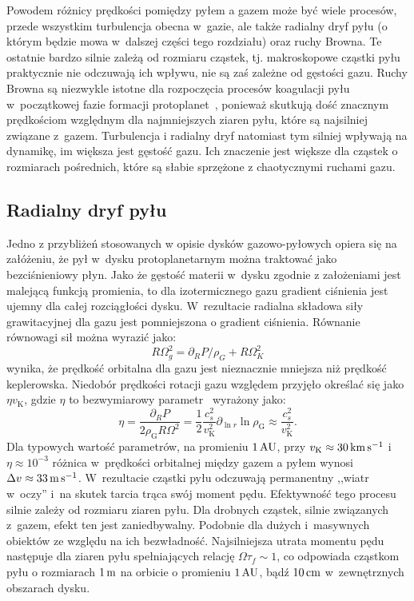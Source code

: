 %
Powodem różnicy prędkości pomiędzy pyłem a gazem może być wiele
procesów, przede wszystkim turbulencja obecna w~gazie, ale także radialny dryf
pyłu (o którym będzie mowa w~dalszej części tego rozdziału) oraz ruchy
Browna. Te ostatnie bardzo silnie zależą od rozmiaru cząstek, tj.
makroskopowe cząstki pyłu praktycznie nie odczuwają ich wpływu, nie są zaś
zależne od gęstości gazu. Ruchy Browna są niezwykle istotne dla rozpoczęcia
procesów koagulacji pyłu w~początkowej fazie formacji
protoplanet~\citep{DD05}, ponieważ skutkują dość znacznym prędkościom względnym
dla najmniejszych ziaren pyłu, które są najsilniej związane z~gazem. Turbulencja
i radialny dryf natomiast tym silniej wpływają na dynamikę, im większa jest
gęstość gazu. Ich znaczenie jest większe dla cząstek o rozmiarach pośrednich, które
są słabie sprzężone z chaotycznymi ruchami gazu.

\subsection{Radialny dryf pyłu}
Jedno z przybliżeń stosowanych w opisie dysków gazowo-pyłowych opiera się na
załóżeniu, że pył w~dysku protoplanetarnym można traktować jako bezciśnieniowy płyn. 
Jako że gęstość materii w~dysku zgodnie z założeniami jest malejącą funkcją
promienia, to dla izotermicznego gazu gradient ciśnienia jest ujemny dla całej
rozciągłości dysku. W~rezultacie radialna składowa siły grawitacyjnej dla gazu
jest pomniejszona o gradient ciśnienia. Równanie równowagi sił można wyrazić
jako:
%
\begin{equation}
   R\Omega_g^2 = \partial_R P / \rho_G + R\Omega_K^2
\end{equation}
%
wynika, że prędkość orbitalna dla gazu jest nieznacznie mniejsza niż prędkość
keplerowska. Niedobór prędkości rotacji gazu względem przyjęło określać się jako
$\eta v_\textrm{K}$, gdzie $\eta$ to bezwymiarowy parametr~\cite{N86}
wyrażony jako:
%
\begin{equation}
   \label{eq:eta}
   \eta = \frac{\partial_R P}{2\rho_\textrm{G} R \Omega^2} = \frac{1}{2}
   \frac{c_s^2}{v_\textrm{K}^2} \partial_{\ln r} \ln \rho_{\textrm{G}} \approx
   \frac{c_s^2}{v_\textrm{K}^2}.
\end{equation}
%
Dla typowych wartość parametrów, na promieniu $1\hbox{$\thinspace\textrm{AU}$}$, przy $v_\textrm{K}\approx
30\hbox{$\thinspace\textrm{km}$}\hbox{$\thinspace\textrm{s}$}^{-1}$ i~$\eta \approx 10^{-3}$ różnica w~prędkości orbitalnej między
gazem a pyłem wynosi $\Delta v \approx 33\hbox{$\thinspace\textrm{m}$}\hbox{$\thinspace\textrm{s}$}^{-1}$.
W~rezultacie cząstki pyłu odczuwają permanentny ,,wiatr w~oczy'' i~na skutek
tarcia trąca swój moment pędu. Efektywność tego procesu silnie zależy od
rozmiaru ziaren pyłu. Dla drobnych cząstek, silnie związanych z~gazem, efekt ten
jest zaniedbywalny. Podobnie dla dużych i~masywnych obiektów ze względu na ich
bezwładność. Najsilniejsza utrata momentu pędu następuje dla ziaren pyłu
spełniających relację $\Omega \tau_f \sim 1$, co odpowiada cząstkom pyłu o
rozmiarach $1\hbox{$\thinspace\textrm{m}$}$ na orbicie o promieniu $1\hbox{$\thinspace\textrm{AU}$}$, bądź $10\hbox{$\thinspace\textrm{cm}$}$ w~zewnętrznych
obszarach dysku.


